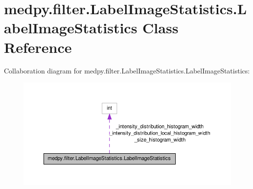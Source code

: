 \hypertarget{classmedpy_1_1filter_1_1LabelImageStatistics_1_1LabelImageStatistics}{
\section{medpy.filter.LabelImageStatistics.LabelImageStatistics Class Reference}
\label{classmedpy_1_1filter_1_1LabelImageStatistics_1_1LabelImageStatistics}
}


Collaboration diagram for medpy.filter.LabelImageStatistics.LabelImageStatistics:\nopagebreak
\begin{figure}[H]
\begin{center}
\leavevmode
\includegraphics[width=400pt]{classmedpy_1_1filter_1_1LabelImageStatistics_1_1LabelImageStatistics__coll__graph}
\end{center}
\end{figure}

